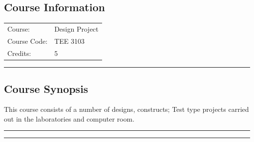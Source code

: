 
\subsection*{Course Information}
\vspace{0ex}%
\noindent\parbox{0.5\textwidth}{%
    \noindent\begin{tabular}{@{}ll}
                 \textsf{Course:}          & 	Design Project \\
                 \textsf{Course Code:}         & 	TEE 3103 \\
                 \textsf{Credits:}    & 	5
    \end{tabular}}
\vspace{2ex}\hrule\vspace{2ex}


\subsection*{Course Synopsis}
This course consists of a number of designs, constructs; Test type projects carried out in the laboratories and computer room.
\vspace{2ex}\hrule
\vspace{2ex}\hrule\vspace{2ex}